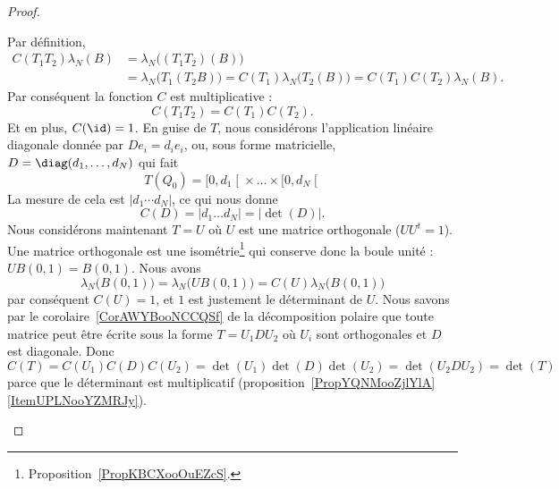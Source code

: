 \begin{proof}
	\begin{subproof}
		\spitem[\( C(T_1T_2)=C(T_1)C(T_2)\)]
		Par définition,
		\begin{subequations}
			\begin{align}
				C(T_1T_2)\lambda_N(B) & =\lambda_N\big( (T_1T_2)(B) \big)                                                           \\
				                      & =\lambda_N\big( T_1(T_2B) \big)=C(T_1)\lambda_N\big( T_2(B) \big)=C(T_1)C(T_2)\lambda_N(B).
			\end{align}
		\end{subequations}
		Par conséquent la fonction \( C\) est multiplicative :
		\begin{equation}
			C(T_1T_2)=C(T_1)C(T_2).
		\end{equation}
		Et en plus, \( C(\id)=1\).
		En guise de \( T\), nous considérons l'application linéaire diagonale donnée par \( De_i=d_ie_i\), ou, sous forme matricielle, \( D=\diag(d_1,\ldots, d_N)\) qui fait
		\begin{equation}
			T(Q_0)=\mathopen[ 0 , d_1 \mathclose[\times \ldots\times \mathopen[  0, d_N \mathclose[
		\end{equation}
		La mesure de cela est \( |d_1\cdots d_N|\), ce qui nous donne
		\begin{equation}
			C(D)=| d_1\ldots d_N |=| \det(D) |.
		\end{equation}
		Nous considérons maintenant \( T=U\) où \( U\) est une matrice orthogonale (\( UU^t=1\)). Une matrice orthogonale est une isométrie\footnote{Proposition~\ref{PropKBCXooOuEZcS}.} qui conserve donc la boule unité : \( UB(0,1)=B(0,1)\). Nous avons
		\begin{equation}
			\lambda_N\big( B(0,1) \big)=\lambda_N\big( UB(0,1) \big)=C(U)\lambda_N\big( B(0,1) \big)
		\end{equation}
		par conséquent \( C(U)=1\), et \( 1\) est justement le déterminant de \( U\).
		Nous savons par le corolaire~\ref{CorAWYBooNCCQSf} de la décomposition polaire que toute matrice peut être écrite sous la forme \( T=U_1DU_2\) où \( U_i\) sont orthogonales et \( D\) est diagonale. Donc \( C(T)=C(U_1)C(D)C(U_2)=\det(U_1)\det(D)\det(U_2)=\det(U_2DU_2)=\det(T)\) parce que le déterminant est multiplicatif (proposition~\ref{PropYQNMooZjlYlA}\ref{ItemUPLNooYZMRJy}).
	\end{subproof}
\end{proof}

